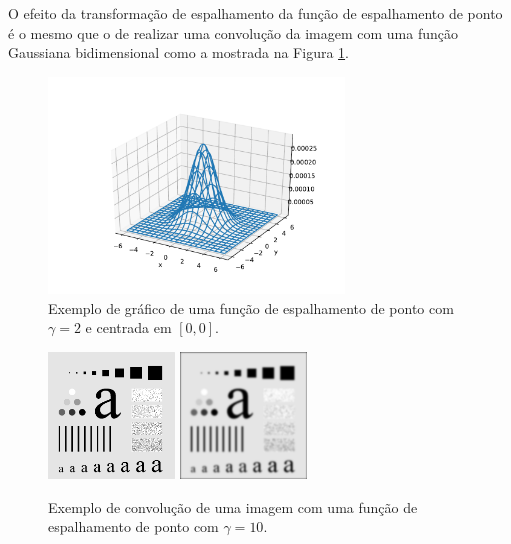 \documentclass[12pt,openright,oneside,a4paper,english,brazil]{abntex2}
\begin{document}
O efeito da transformação de espalhamento da função de espalhamento de ponto é o mesmo que o de realizar uma convolução da imagem com uma função Gaussiana bidimensional como a mostrada na Figura \ref{fig:psfplot}.


\begin{figure}[h]
	\centering
	\includegraphics[width = 0.7\textwidth]{./figures/psf1.pdf}
	\caption{Exemplo de gráfico de uma função de espalhamento de ponto com $\gamma = 2$ e centrada em $[0,0]$.}
	\label{fig:psfplot}
\end{figure}

\begin{figure}
	\centering
	\includegraphics[width = 0.3\textwidth]{./figures/psfexample0.png}
	\includegraphics[width = 0.3\textwidth]{./figures/psfexample1.png}
	\caption{Exemplo de convolução de uma imagem com uma função de espalhamento de ponto com $\gamma = 10$.}
	\label{fig:psfexample}
\end{figure}
\end{document}

